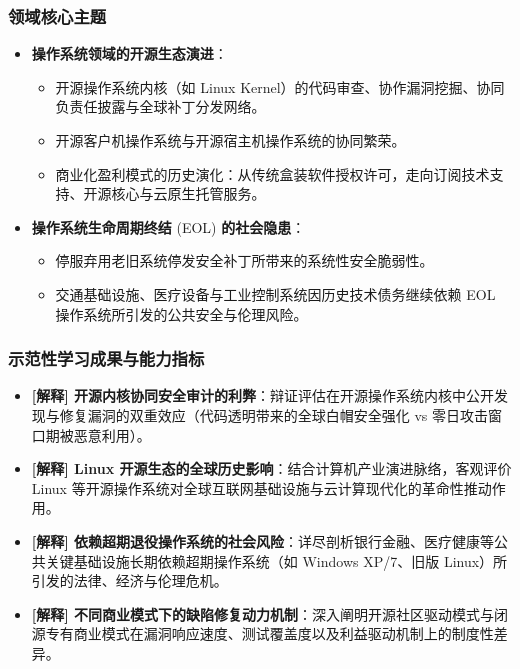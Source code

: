 \subsubsection{领域核心主题}
\begin{itemize}\setlength{\itemsep}{0pt}\setlength{\parskip}{0pt}
    \item \textbf{操作系统领域的开源生态演进}：
    \begin{itemize}\setlength{\itemsep}{0pt}\setlength{\parskip}{0pt}
        \item 开源操作系统内核（如 Linux Kernel）的代码审查、协作漏洞挖掘、协同负责任披露与全球补丁分发网络。
        \item 开源客户机操作系统与开源宿主机操作系统的协同繁荣。
        \item 商业化盈利模式的历史演化：从传统盒装软件授权许可，走向订阅技术支持、开源核心与云原生托管服务。
    \end{itemize}
    \item \textbf{操作系统生命周期终结} (EOL) \textbf{的社会隐患}：
    \begin{itemize}\setlength{\itemsep}{0pt}\setlength{\parskip}{0pt}
        \item 停服弃用老旧系统停发安全补丁所带来的系统性安全脆弱性。
        \item 交通基础设施、医疗设备与工业控制系统因历史技术债务继续依赖 EOL 操作系统所引发的公共安全与伦理风险。
    \end{itemize}
\end{itemize}

\subsubsection{示范性学习成果与能力指标}
\begin{itemize}\setlength{\itemsep}{0pt}\setlength{\parskip}{0pt}
    \item \textbf{[解释] 开源内核协同安全审计的利弊}：辩证评估在开源操作系统内核中公开发现与修复漏洞的双重效应（代码透明带来的全球白帽安全强化 vs 零日攻击窗口期被恶意利用）。
    \item \textbf{[解释] Linux 开源生态的全球历史影响}：结合计算机产业演进脉络，客观评价 Linux 等开源操作系统对全球互联网基础设施与云计算现代化的革命性推动作用。
    \item \textbf{[解释] 依赖超期退役操作系统的社会风险}：详尽剖析银行金融、医疗健康等公共关键基础设施长期依赖超期操作系统（如 Windows XP/7、旧版 Linux）所引发的法律、经济与伦理危机。
    \item \textbf{[解释] 不同商业模式下的缺陷修复动力机制}：深入阐明开源社区驱动模式与闭源专有商业模式在漏洞响应速度、测试覆盖度以及利益驱动机制上的制度性差异。
\end{itemize}

